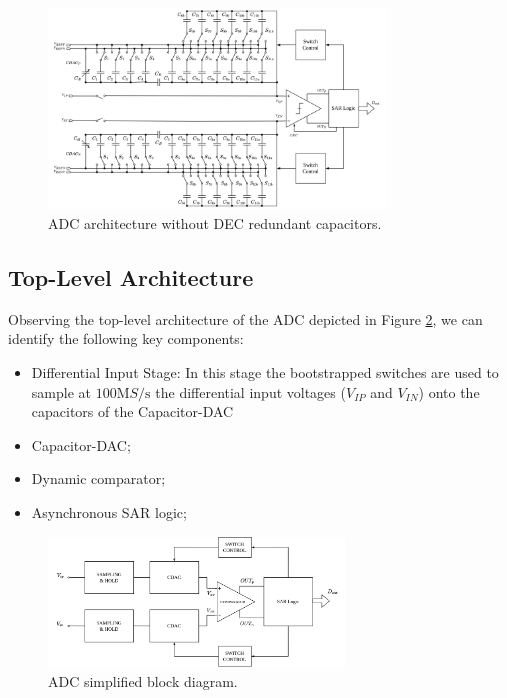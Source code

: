 \begin{figure}[h]
    \centering
    \includegraphics[width=0.8\textwidth]{Images/ADC-arch.png}
    \caption{ADC architecture without DEC redundant capacitors.}
    \label{fig:ADC-sch-no-DEC}
\end{figure}

\subsection{Top-Level Architecture}

Observing the top-level architecture of the ADC depicted in Figure \ref{fig:ADC-block-diagram}, we can identify the following key components:
\begin{itemize}
    \item Differential Input Stage: In this stage the bootstrapped switches are used to sample at $100 \si{\mega S \per \second}$ the differential input voltages ($V_{IP}$ and $V_{IN}$) onto the capacitors of the Capacitor-DAC 
    \item Capacitor-DAC;
    \item Dynamic comparator;
    \item Asynchronous SAR logic;
\end{itemize}

\begin{figure}[H]
    \centering
    \includegraphics[width=0.7\textwidth]{Images/ADC-block-diagram.png}
    \caption{ADC simplified block diagram.}
    \label{fig:ADC-block-diagram}
\end{figure}

